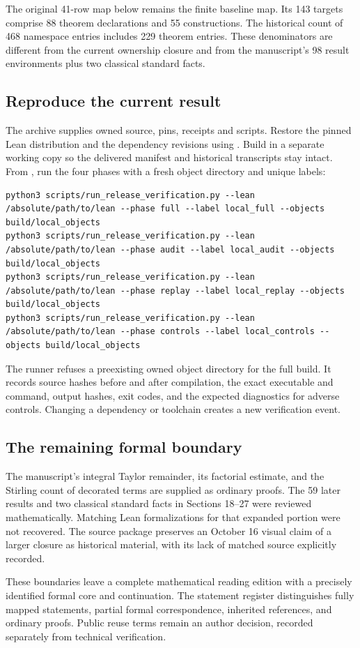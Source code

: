 The original 41-row map below remains the finite baseline map. Its 143 targets comprise 88 theorem declarations and 55 constructions. The historical count of 468 namespace entries includes 229 theorem entries. These denominators are different from the current ownership closure and from the manuscript's 98 result environments plus two classical standard facts.

\subsection*{Reproduce the current result}
The archive supplies owned source, pins, receipts and scripts. Restore the pinned Lean distribution and the dependency revisions using . Build in a separate working copy so the delivered manifest and historical transcripts stay intact. From , run the four phases with a fresh object directory and unique labels:
\begin{Verbatim}[fontsize=\small,frame=leftline,breaklines=true,breakanywhere=true]
python3 scripts/run_release_verification.py --lean /absolute/path/to/lean --phase full --label local_full --objects build/local_objects
python3 scripts/run_release_verification.py --lean /absolute/path/to/lean --phase audit --label local_audit --objects build/local_objects
python3 scripts/run_release_verification.py --lean /absolute/path/to/lean --phase replay --label local_replay --objects build/local_objects
python3 scripts/run_release_verification.py --lean /absolute/path/to/lean --phase controls --label local_controls --objects build/local_objects
\end{Verbatim}
The runner refuses a preexisting owned object directory for the full build. It records source hashes before and after compilation, the exact executable and command, output hashes, exit codes, and the expected diagnostics for adverse controls. Changing a dependency or toolchain creates a new verification event.

\subsection*{The remaining formal boundary}
The manuscript's integral Taylor remainder, its factorial estimate, and the Stirling count of decorated terms are supplied as ordinary proofs. The 59 later results and two classical standard facts in Sections 18--27 were reviewed mathematically. Matching Lean formalizations for that expanded portion were not recovered. The source package preserves an October 16 visual claim of a larger closure as historical material, with its lack of matched source explicitly recorded.

These boundaries leave a complete mathematical reading edition with a precisely identified formal core and continuation. The statement register distinguishes fully mapped statements, partial formal correspondence, inherited references, and ordinary proofs. Public reuse terms remain an author decision, recorded separately from technical verification.
